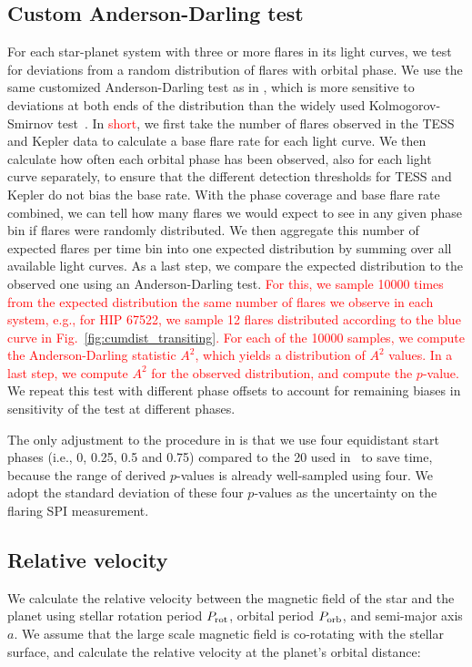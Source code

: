 \documentclass[twocolumn]{aastex631}
\begin{document}
\subsection{Custom Anderson-Darling test}
\label{sec:methods:adtest}
For each star-planet system with three or more flares in its light curves, we test for deviations from a random distribution of flares with orbital phase. We use the same customized Anderson-Darling test as in \cite{ilin2022searching}, which is more sensitive to deviations at both ends of the distribution than the widely used Kolmogorov-Smirnov test~\citep{feigelson2012modern}. In \textcolor{red}{short}, we first take the number of flares observed in the TESS and Kepler data to calculate a base flare rate for each light curve. We then calculate how often each orbital phase has been observed, also for each light curve separately, to ensure that the different detection thresholds for TESS and Kepler do not bias the base rate. With the phase coverage and base flare rate combined, we can tell how many flares we would expect to see in any given phase bin if flares were randomly distributed. We then aggregate this number of expected flares per time bin into one expected distribution by summing over all available light curves. As a last step, we compare the expected distribution to the observed one using an Anderson-Darling test. \textcolor{red}{For this, we sample 10000 times from the expected distribution the same number of flares we observe in each system, e.g., for HIP 67522, we sample 12 flares distributed according to the blue curve in Fig.~\ref{fig:cumdist_transiting}. For each of the 10000 samples, we compute the Anderson-Darling statistic $A^2$, which yields a distribution of $A^2$ values. In a last step, we compute $A^2$ for the observed distribution, and compute the $p$-value.} We repeat this test with different phase offsets to account for remaining biases in sensitivity of the test at different phases.

The only adjustment to the procedure in \cite{ilin2022searching} is that we use four equidistant start phases (i.e., 0, 0.25, 0.5 and 0.75) compared to the 20 used in~\cite{ilin2022searching} to save time, because the range of derived $p$-values is already well-sampled using four. We adopt the standard deviation of these four $p$-values as the uncertainty on the flaring SPI measurement.



\subsection{Relative velocity}
\label{sec:methods:relvel}
We calculate the relative velocity between the magnetic field of the star and the planet using stellar rotation period $P_{\rm rot}$, orbital period $P_{\rm orb}$, and semi-major axis $a$. We assume that the large scale magnetic field is co-rotating with the stellar surface, and calculate the relative velocity at the planet's orbital distance:
\end{document}
